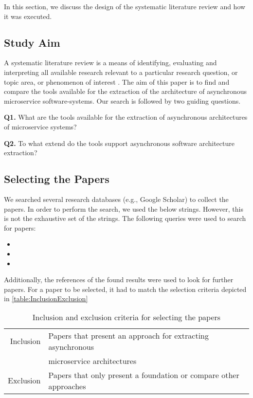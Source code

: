 In this section, we discuss the design of the systematic literature review and how it was executed.

\subsection{Study Aim}
\label{sec:StudyDesign:StudyAim}
A systematic literature review is a means of identifying, evaluating and interpreting all available research relevant to a particular research question, or topic area, or phenomenon of interest \cite{Keele2007guidelines}.
The aim of this paper is to find and compare the tools available for the extraction of the architecture of asynchronous microservice software-systems.
Our search is followed by two guiding questions.

\textbf{Q1.} What are the tools available for the extraction of asynchronous architectures of microservice systems?

\textbf{Q2.} To what extend do the tools support asynchronous software architecture extraction?

\subsection{Selecting the Papers}
\label{sec:StudyDesign:SelectingPapers}
We searched several research databases (e.g., Google Scholar) to collect the papers.
In order to perform the search, we used the below strings.
However, this is not the exhaustive set of the strings.
The following queries were used to search for papers:
\begin{itemize}
	\item {}
	\item {}
	\item {}
\end{itemize}

Additionally, the references of the found results were used to look for further papers.
For a paper to be selected, it had to match the selection criteria depicted in \autoref{table:InclusionExclusion}


\begin{table}
\centering
\begin{tabular}{r l}
\toprule
Inclusion
& Papers that present an approach for extracting asynchronous \\
& microservice architectures \\
\midrule
Exclusion
& Papers that only present a foundation or compare other approaches \\
\bottomrule
\end{tabular}
\caption{Inclusion and exclusion criteria for selecting the papers}
\label{table:InclusionExclusion}
\end{table}


